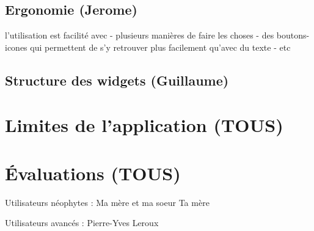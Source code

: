 	\section{Ergonomie (Jerome)}
		l'utilisation est facilité avec
			- plusieurs manières de faire les choses
			- des boutons-icones qui permettent de s'y retrouver plus facilement qu'avec du texte
			- etc
				
	\section{Structure des widgets (Guillaume)}
		
		
	
\chapter{Limites de l'application (TOUS)}
	


\chapter{Évaluations (TOUS)}
	
	Utilisateurs néophytes :
		Ma mère et ma soeur
		Ta mère
		
	Utilisateurs avancés :
		Pierre-Yves
		Leroux

